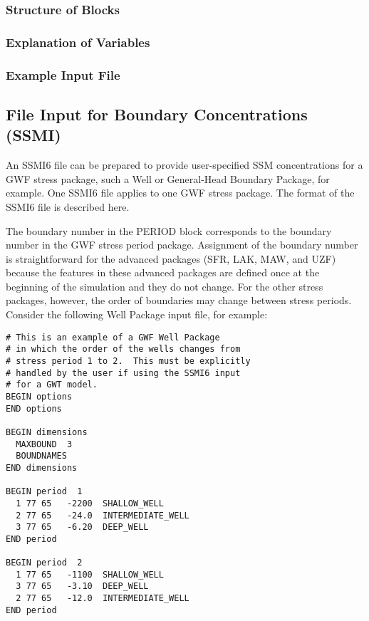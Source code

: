 \vspace{5mm}
\subsubsection{Structure of Blocks}




\vspace{5mm}
\subsubsection{Explanation of Variables}
\begin{description}

\end{description}

\vspace{5mm}
\subsubsection{Example Input File}



\newpage
\subsection{File Input for Boundary Concentrations (SSMI)}
An SSMI6 file can be prepared to provide user-specified SSM concentrations for a GWF stress package, such a Well or General-Head Boundary Package, for example.  One SSMI6 file applies to one GWF stress package.  The format of the SSMI6 file is described here.

The boundary number in the PERIOD block corresponds to the boundary number in the GWF stress period package.  Assignment of the boundary number is straightforward for the advanced packages (SFR, LAK, MAW, and UZF) because the features in these advanced packages are defined once at the beginning of the simulation and they do not change.  For the other stress packages, however, the order of boundaries may change between stress periods.  Consider the following Well Package input file, for example:

\begin{verbatim}
# This is an example of a GWF Well Package
# in which the order of the wells changes from
# stress period 1 to 2.  This must be explicitly
# handled by the user if using the SSMI6 input
# for a GWT model.
BEGIN options
END options

BEGIN dimensions
  MAXBOUND  3
  BOUNDNAMES
END dimensions

BEGIN period  1
  1 77 65   -2200  SHALLOW_WELL
  2 77 65   -24.0  INTERMEDIATE_WELL
  3 77 65   -6.20  DEEP_WELL
END period

BEGIN period  2
  1 77 65   -1100  SHALLOW_WELL
  3 77 65   -3.10  DEEP_WELL
  2 77 65   -12.0  INTERMEDIATE_WELL
END period
\end{verbatim}

